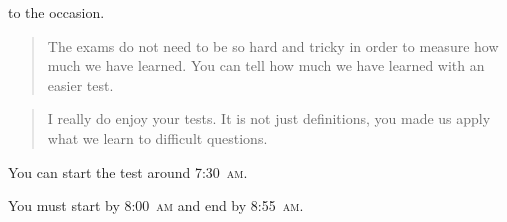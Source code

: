\documentclass[t]{beamer}
\begin{document}
\begin{frame}{ to the occasion.}
%
	\hangpara \begin{quote}The exams do not need to be so hard and tricky in order to measure how much we have learned. You can tell how much we have learned with an easier test.
	\end{quote}
%
	\hangpara \begin{quote}I really do enjoy your tests. It is not just definitions, you made us apply what we learn to difficult questions.
	\end{quote}
%
\end{frame}

\begin{frame}{You can start the test around 7:30~\textsc{am}.}

You must start by 8:00~\textsc{am} and end by 8:55~\textsc{am}.
\end{frame}
\end{document}
